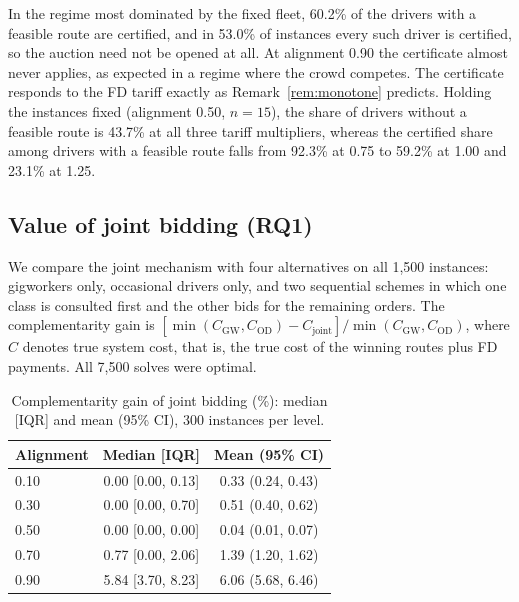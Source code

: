 \documentclass[review,12pt]{elsarticle}
\theoremstyle{definition}
\theoremstyle{remark}
\begin{document}
In the regime most dominated by the fixed fleet, 60.2\% of the drivers with a
feasible route are certified, and in 53.0\% of instances every such driver
is certified, so the auction need not be opened at all. At alignment 0.90 the
certificate almost never applies, as expected in a regime where the crowd
competes. The certificate responds to the FD tariff exactly as
Remark~\ref{rem:monotone} predicts. Holding the instances fixed (alignment
0.50, $n=15$), the share of drivers without a feasible route is 43.7\% at all
three tariff multipliers, whereas the certified share among drivers with a
feasible route falls from 92.3\% at 0.75 to 59.2\% at 1.00 and 23.1\% at
1.25.

\subsection{Value of joint bidding (RQ1)}

We compare the joint mechanism with four alternatives on all 1,500
instances: gigworkers only, occasional drivers only, and two sequential
schemes in which one class is consulted first and the other bids for the
remaining orders. The complementarity gain is
$[\min(C_{\mathrm{GW}},C_{\mathrm{OD}})-C_{\mathrm{joint}}]/\min(C_{\mathrm{GW}},C_{\mathrm{OD}})$,
where $C$ denotes true system cost, that is, the true cost of the winning
routes plus FD payments. All 7,500 solves were optimal.

\begin{table}[t]
\centering
\caption{Complementarity gain of joint bidding (\%): median [IQR] and mean (95\% CI), 300 instances per level.}
\label{tab:rq1}
\small
\begin{tabular}{lcc}
\toprule
Alignment & Median [IQR] & Mean (95\% CI)\\
\midrule
0.10 & 0.00 [0.00, 0.13] & 0.33 (0.24, 0.43)\\
0.30 & 0.00 [0.00, 0.70] & 0.51 (0.40, 0.62)\\
0.50 & 0.00 [0.00, 0.00] & 0.04 (0.01, 0.07)\\
0.70 & 0.77 [0.00, 2.06] & 1.39 (1.20, 1.62)\\
0.90 & 5.84 [3.70, 8.23] & 6.06 (5.68, 6.46)\\
\bottomrule
\end{tabular}
\end{table}
\end{document}
